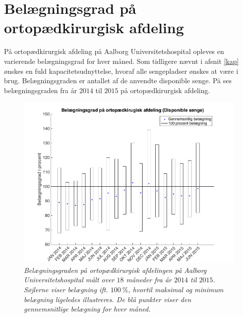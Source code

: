 \section{Belægningsgrad på ortopædkirurgisk afdeling} \label{omfang}
På ortopædkirurgisk afdeling på Aalborg Universitetshospital opleves en varierende belægningsgrad for hver måned. Som tidligere nævnt i afsnit \ref{kap} ønskes en fuld kapacitetsudnyttelse, hvoraf alle sengepladser ønskes at være i brug. Belægningsgraden er antallet af de anvendte disponible senge. På  ses belægningsgraden fra år $2014$ til $2015$ på ortopædkirurgisk afdeling.\cite{SDS2015}


\begin{figure}[H]
	\flushleft 
	\centering
	\includegraphics[scale=.45]{figures/maxminoverbelaeg.png}
	\flushleft
	\caption{\textit{Belægningsgraden på ortopædkirurgisk afdelingen på Aalborg Universitetshospital målt over $18$ måneder fra år $2014$ til $2015$. Søjlerne viser belægning ift. $100~\%$, hvortil maksimal og minimum belægning ligeledes illustreres. De blå punkter viser den gennemsnitlige belægning for hver måned.}\cite{SDS2015}}
	\label{maxminbelaeg}
\end{figure}

